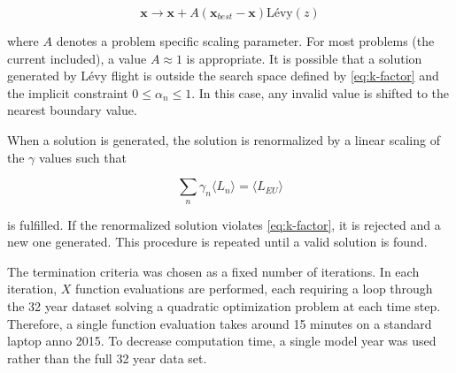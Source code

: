 \documentclass[a4paper, 5p, sort&compress]{elsarticle}%
\newcommand{\paren}[1]{\left(#1\right)}
\begin{document}
\begin{equation}
  \label{eq:1}
  \boldsymbol x \to \boldsymbol x + A \paren{\boldsymbol x_{best}- \boldsymbol x} \mbox{Lévy}(z) 
\end{equation}

where $A$ denotes a problem specific scaling parameter. For most
problems (the current included), a value $A \approx 1$ is appropriate. It is
possible that a solution generated by Lévy flight is outside the
search space defined by \cref{eq:k-factor} and the implicit constraint
$0 \leq \alpha_{n} \leq 1$. In this case, any invalid value is shifted to
the nearest boundary value. %

% 
% 

When a solution is generated, the solution is renormalized by a linear
scaling of the $\gamma$ values such that

\begin{equation}
  \label{eq:10}
  \sum_{n} \gamma_{n} \langle L_{n} \rangle = \langle L_{EU} \rangle
\end{equation}

is fulfilled. If the renormalized solution violates
\cref{eq:k-factor}, it is rejected and a new one generated. This
procedure is repeated until a valid solution is found.

The termination criteria was chosen as a fixed number of
iterations. In each iteration, $X$ function evaluations are performed,
each requiring a loop through the 32 year dataset solving a quadratic
optimization problem at each time step. Therefore, a single function
evaluation takes around 15 minutes on a standard laptop anno 2015. To
decrease computation time, a single model year was used rather than
the full 32 year data set.
\end{document}
